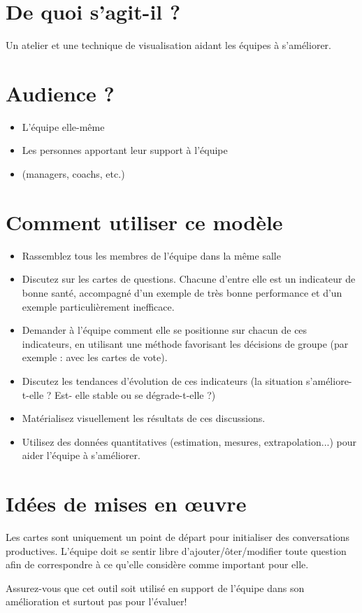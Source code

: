 \documentclass[10pt]{article}
\begin{document}
\begin{minipage}{0.6\linewidth}
\section*{De  quoi  s’agit-il ?}
Un  atelier et  une technique de  visualisation  aidant  les équipes à s’améliorer.

\section*{Audience  ?}
\begin{itemize}
  \item L’équipe  elle-même 
  \item Les personnes apportant leur  support à l’équipe
  \item (managers,  coachs, etc.) 
\end{itemize}


\section*{Comment utiliser  ce  modèle}
\begin{itemize}
  \item Rassemblez  tous  les membres de  l’équipe  dans  la  même  salle 
  \item Discutez  sur les cartes  de  questions. Chacune d’entre elle  est un  indicateur  de  bonne santé,  accompagné  d’un  exemple de  très  bonne performance et  d’un  exemple particulièrement  inefficace. 
  \item Demander  à l’équipe  comment elle  se  positionne sur chacun  de  ces indicateurs,  en  utilisant une méthode favorisant  les décisions de  groupe  (par  exemple : avec  les cartes  de  vote).  
  \item Discutez  les tendances d’évolution de  ces indicateurs (la situation s’améliore-t-elle ? Est- elle  stable  ou  se  dégrade-t-elle  ?)
  \item Matérialisez  visuellement  les résultats de  ces discussions.  
  \item Utilisez des données quantitatives (estimation,  mesures,  extrapolation...)  pour  aider l’équipe  à s’améliorer.  
\end{itemize}


\section*{Idées de  mises en  œuvre}
  Les cartes  sont  uniquement  un  point de  départ  pour  initialiser des conversations productives. L’équipe  doit  se  sentir libre d’ajouter/ôter/modifier toute question afin  de  correspondre  à ce  qu’elle considère comme important pour  elle.

  Assurez-vous  que cet outil  soit  utilisé  en  support de  l’équipe  dans  son amélioration  et  surtout pas pour  l’évaluer!
\end{minipage} \hfill
\end{document}
